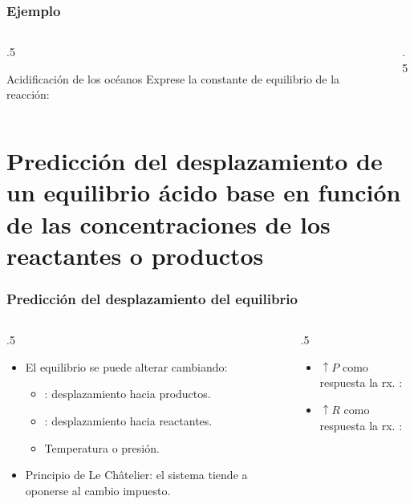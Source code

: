 \documentclass[11pt, aspectratio=169, xcolor=table]{beamer}
\begin{document}
\begin{frame}[allowdisplaybreaks]
	\frametitle{Ejemplo}
	\begin{columns}
		\begin{column}{.5\textwidth}
			\begin{exampleblock}{Acidificación de los océanos}
				Exprese la constante de equilibrio de la reacción:
			\end{exampleblock}

		\end{column}

		\begin{column}{.5\textwidth}

		\end{column}
	\end{columns}
\end{frame}

\section{Predicción del desplazamiento de un equilibrio ácido base en función de las concentraciones de los reactantes o productos}

\begin{frame}[allowdisplaybreaks]
	\frametitle{Predicción del desplazamiento del equilibrio}
	\begin{columns}
		\begin{column}{.5\textwidth}
			\begin{itemize}[<+->]
				\item El equilibrio se puede alterar cambiando:
				      \begin{itemize}[<+->]
					      \item [Reactantes]: desplazamiento hacia productos.
					      \item [Productos]: desplazamiento hacia reactantes.
					      \item Temperatura o presión.
				      \end{itemize}
				\item Principio de Le Châtelier: el sistema tiende a oponerse al cambio impuesto.
			\end{itemize}
		\end{column}

		\begin{column}{.5\textwidth}
			\begin{itemize}[<+->]
				\item $\uparrow P$ como respuesta la rx. : \ce{R <<=> P}
				\item $\uparrow R$ como respuesta la rx. : \ce{R <=>> P}
			\end{itemize}
		\end{column}
	\end{columns}
\end{frame}
\end{document}
